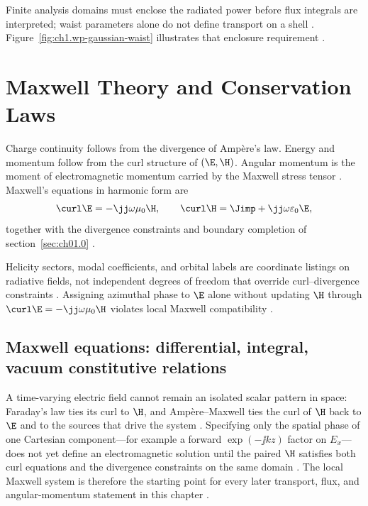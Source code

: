 Finite analysis domains must enclose the radiated power before flux integrals are interpreted; waist parameters alone do not define transport on a shell \cite{allen1992,stratton1941}. Figure~\ref{fig:ch1.wp-gaussian-waist} illustrates that enclosure requirement \cite{stratton1941}.

\section{Maxwell Theory and Conservation Laws}
\label{sec:ch01.1}

Charge continuity follows from the divergence of Amp\`ere's law. Energy and momentum
follow from the curl structure of $(\E,\H)$. Angular momentum is the moment of
electromagnetic momentum carried by the Maxwell stress tensor
\cite{maxwell1873,poynting1884,beth1936}. Maxwell's equations in harmonic form are
\begin{equation}
\label{eq:ch1.maxwell-centre}
\curl \E=-\jj\omega\mu_0\H,\qquad
\curl \H=\Jimp+\jj\omega\varepsilon_0\E,
\end{equation}
together with the divergence constraints and boundary completion of section~\ref{sec:ch01.0} \cite{stratton1941}.

Helicity sectors, modal coefficients, and orbital labels are coordinate listings on radiative fields, not independent degrees of freedom that override curl--divergence constraints \cite{maxwell1873,jackson1999}. Assigning azimuthal phase to $\E$ alone without updating $\H$ through $\curl\E=-\jj\omega\mu_0\H$ violates local Maxwell compatibility \cite{stratton1941}.

\subsection{Maxwell equations: differential, integral, vacuum constitutive relations}
\label{sec:ch01.1.1}

A time-varying electric field cannot remain an isolated scalar pattern in space: Faraday's law ties its curl to $\H$, and Amp\`ere--Maxwell ties the curl of $\H$ back to $\E$ and to the sources that drive the system \cite{maxwell1873,stratton1941}. Specifying only the spatial phase of one Cartesian component---for example a forward $\exp(-\jj k z)$ factor on $E_x$---does not yet define an electromagnetic solution until the paired $\H$ satisfies both curl equations and the divergence constraints on the same domain \cite{stratton1941,jackson1999}. The local Maxwell system is therefore the starting point for every later transport, flux, and angular-momentum statement in this chapter \cite{stratton1941}.


